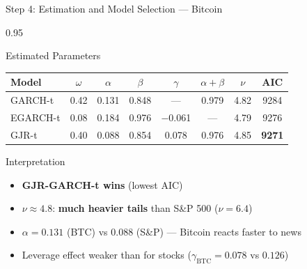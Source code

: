 \documentclass[9pt, aspectratio=169, t]{beamer}
\begin{document}
\begin{frame}{Step 4: Estimation and Model Selection --- Bitcoin}
    \begin{cminipage}{0.95\textwidth}
    \begin{block}{Estimated Parameters}
        \begin{center}
        {\small
        \begin{tabular}{lccccccc}
            \toprule
            \textbf{Model} & $\omega$ & $\alpha$ & $\beta$ & $\gamma$ & $\alpha\!+\!\beta$ & $\nu$ & \textbf{AIC} \\
            \midrule
            GARCH-t & 0.42 & 0.131 & 0.848 & --- & 0.979 & 4.82 & 9284 \\
            EGARCH-t & 0.08 & 0.184 & 0.976 & $-$0.061 & --- & 4.79 & 9276 \\
            GJR-t & 0.40 & 0.088 & 0.854 & 0.078 & 0.976 & 4.85 & \textbf{9271} \\
            \bottomrule
        \end{tabular}
        }
        \end{center}
    \end{block}
    \begin{block}{Interpretation}
        \begin{itemize}\setlength{\itemsep}{0pt}
            \item \textbf{GJR-GARCH-t wins} (lowest AIC)
            \item $\nu \approx 4.8$: \textbf{much heavier tails} than S\&P 500 ($\nu = 6.4$)
            \item $\alpha = 0.131$ (BTC) vs $0.088$ (S\&P) --- Bitcoin reacts faster to news
            \item Leverage effect weaker than for stocks ($\gamma_{\text{BTC}} = 0.078$ vs $0.126$)
        \end{itemize}
    \end{block}
    \end{cminipage}
\end{frame}
\end{document}
